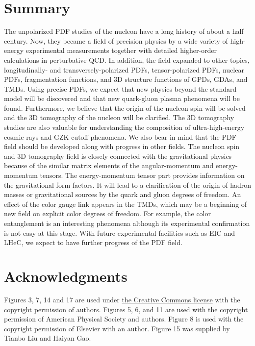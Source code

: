 \documentclass{PoS}
\begin{document}
\section{Summary}
\label{summary}

The unpolarized PDF studies of the nucleon have a long history of 
about a half century. Now, they became a field of precision physics 
by a wide variety of high-energy experimental measurements together 
with detailed higher-order calculations in perturbative QCD.
In addition, the field expanded to other topics, longitudinally- 
and transversely-polarized PDFs, tensor-polarized PDFs,
nuclear PDFs, fragmentation functions, and 3D structure functions
of GPDs, GDAs, and TMDs. 
Using precise PDFs, we expect that new physics beyond
the standard model will be discovered and that new quark-gluon plasma
phenomena will be found. Furthermore, we believe that the origin 
of the nucleon spin will be solved and the 3D tomography
of the nucleon will be clarified. The 3D tomography studies are 
also valuable for understanding the composition of ultra-high-energy 
cosmic rays and GZK cutoff phenomena. 
We also bear in mind that the PDF field should be developed
along with progress in other fields.
The nucleon spin and 3D tomography field is closely connected
with the gravitational physics because of the similar 
matrix elements of the angular-momentum and energy-momentum tensors.
The energy-momentum tensor part provides information on 
the gravitational form factors.
It will lead to a clarification of the origin of hadron masses 
or gravitational sources by the quark and gluon degrees of freedom.
An effect of the color gauge link appears in the TMDs, which may
be a beginning of new field on explicit color degrees of freedom.
For example, the color entanglement is an interesting phenomena
although its experimental confirmation is not easy at this stage.
With future experimental facilities such as EIC and LHeC,
we expect to have further progress of the PDF field.

\section*{Acknowledgments}

Figures 3, 7, 14 and 17 are used under 
\href{https://creativecommons.org/licenses/by/4.0/}
{the Creative Commons license} with the copyright permission of authors.
Figures 5, 6, and 11 are used with the copyright permission 
of American Physical Society and authors.
Figure 8 is used with the copyright permission of Elsevier 
with an author. Figure 15 was supplied by Tianbo Liu and Haiyan Gao.
\end{document}
